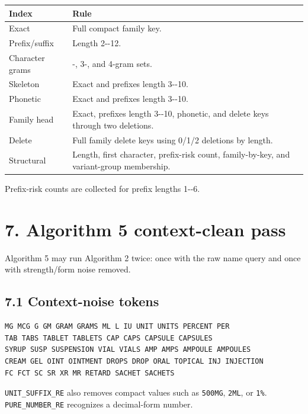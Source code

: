 {\def\LTcaptype{none} %
\begin{longtable}[]{@{}>{\RaggedRight\arraybackslash}p{.27\linewidth}>{\RaggedRight\arraybackslash}p{.66\linewidth}@{}}
\toprule\noalign{}
Index & Rule \\
\midrule\noalign{}
\endhead
\bottomrule\noalign{}
\endlastfoot
Exact & Full compact family key. \\
Prefix/suffix & Length 2-\/-12. \\
Character grams & 2-, 3-, and 4-gram sets. \\
Skeleton & Exact and prefixes length 3-\/-10. \\
Phonetic & Exact and prefixes length 3-\/-10. \\
Family head & Exact, prefixes length 3-\/-10, phonetic, and delete keys through two deletions. \\
Delete & Full family delete keys using 0/1/2 deletions by length. \\
Structural & Length, first character, prefix-risk count, family-by-key, and variant-group membership. \\
\end{longtable}
}

Prefix-risk counts are collected for prefix lengths 1-\/-6.

\section{7. Algorithm 5 context-clean pass}\label{7-algorithm-5-context-clean-pass}

Algorithm 5 may run Algorithm 2 twice: once with the raw name query and once with strength/form noise removed.

\subsection{7.1 Context-noise tokens}\label{71-context-noise-tokens}

\begin{verbatim}
MG MCG G GM GRAM GRAMS ML L IU UNIT UNITS PERCENT PER
TAB TABS TABLET TABLETS CAP CAPS CAPSULE CAPSULES
SYRUP SUSP SUSPENSION VIAL VIALS AMP AMPS AMPOULE AMPOULES
CREAM GEL OINT OINTMENT DROPS DROP ORAL TOPICAL INJ INJECTION
FC FCT SC SR XR MR RETARD SACHET SACHETS
\end{verbatim}

\texttt{UNIT\_\allowbreak{}SUFFIX\_\allowbreak{}RE} also removes compact values such as \texttt{500MG}, \texttt{2ML}, or \texttt{1\%}. \texttt{PURE\_\allowbreak{}NUMBER\_\allowbreak{}RE} recognizes a decimal-form number.

